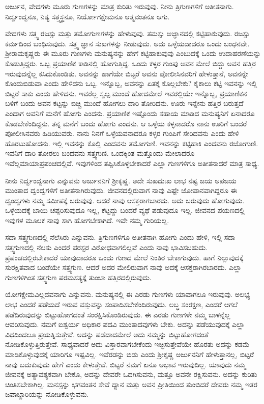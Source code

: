 \begin{artha}
ಅರ್ಜುನ, ವೇದಗಳು ಮೂರು ಗುಣಗಳನ್ನು ಮಾತ್ರ ಕುರಿತು ಇರುವುವು. ನೀನು ತ್ರಿಗುಣಗಳಿಗೆ ಅತೀತನಾಗು. ನಿರ್ದ್ವಂದ್ವನೂ, ನಿತ್ಯ ಸತ್ತ್ವಸ್ಥನೂ, ನಿರ್ಯೋಗಕ್ಷೇಮನೂ ಆತ್ಮವಂತನೂ ಆಗು.
\end{artha}

ವೇದಗಳು ಸತ್ತ್ವ ರಜಸ್ಸು ಮತ್ತು ತಮೋಗುಣಗಳನ್ನು ಹೇಳುವುವು. ತಮಸ್ಸು ಅಜ್ಞಾನದಲ್ಲಿ ಕಟ್ಟಿಹಾಕುವುದು. ರಜಸ್ಸು ಕರ್ಮದಿಂದ ಬಂಧಿಸುವುದು. ಸತ್ತ್ವ ಜ್ಞಾನ ಸುಖಗಳನ್ನು ನೀಡುವುದು. ಅದು ಒಳ್ಳೆಯದಾದರೂ ಒಂದು ಬಂಧನವೇ. ಶ‍್ರೀರಾಮಕೃಷ್ಣರು ಈ ಮೂರು ಗುಣಗಳು ಮನುಷ್ಯನನ್ನು ಹೇಗೆ ಕಟ್ಟಿಹಾಕುವುವು ಎಂಬುದಕ್ಕೆ ಒಂದು ಉದಾಹರಣೆಯನ್ನು ಕೊಡುತ್ತಿದ್ದರು. ಒಬ್ಬ ಪ್ರಯಾಣಿಕ ಕಾಡಿನಲ್ಲಿ ಹೋಗುತ್ತಿದ್ದ. ಒಂದು ಕಳ್ಳರ ಗುಂಪು ಅವನ ಮೇಲೆ ಬಿದ್ದು ಅವನ ಹತ್ತಿರ ಇರುವುದನ್ನೆಲ್ಲ ಕಸಿದುಕೊಂಡಿತು. ಅವನನ್ನು ಹಾಗೆಯೇ ಬಿಟ್ಟರೆ ಅವನು ಪೋಲೀಸಿನವರಿಗೆ ಹೇಳುತ್ತಾನೆ, ಅವನನ್ನೇ ಕೊಂದುಬಿಡುವಾ ಎಂದು ಹೇಳಿದನು ಒಬ್ಬ. ಇನ್ನೊಬ್ಬ, ಅವನನ್ನು ಏತಕ್ಕೆ ಕೊಲ್ಲಬೇಕು? ಕೈಕಾಲು ಕಟ್ಟಿ ಇವನನ್ನು ಇಲ್ಲಿ ಬಿಟ್ಟರೆ ಸಾಕು ಎಂದು ಹೇಳಿದನು. ಇವರೆಲ್ಲ ಸ್ವಲ್ಪ ಮುಂದೆ ಹೋದಮೇಲೆ ಇವರಲ್ಲಿಯೇ ಇನ್ನೊಬ್ಬ, ಪ್ರಯಾಣಿಕನ ಬಳಿಗೆ ಬಂದು ಅವನ ಕಟ್ಟನ್ನು ಬಿಚ್ಚಿ ಮುಂದೆ ಹೋಗಲು ದಾರಿ ತೋರಿದನು. ಊರು ಇನ್ನೇನು ಹತ್ತಿರ ಬರುತ್ತದೆ ಎಂದಾಗ ಅವನಿಗೆ ಮನೆಗೆ ಹೋಗು ಎಂದನು. ಪ್ರಯಾಣಿಕ ಇಷ್ಟೊಂದು ಸಹಾಯ ಮಾಡಿದ ಮನುಷ್ಯನಿಗೆ ಏನಾದರೂ ಕೊಡಬೇಕೆಂದಿದ್ದನು. ತನ್ನ ಮನೆಗೆ ಬಂದು ಹೋಗು ಎಂದನು. ಆ ಒಳ್ಳೆಯ ಕಳ್ಳನಾದರೊ ನಾನು ಊರಿಗೆ ಬಂದರೆ ಪೋಲೀಸಿನವರು ಹಿಡಿಯುವರು. ನಾನು ನಿನಗೆ ಒಳ್ಳೆಯವನಾದರೂ ಕಳ್ಳರ ಗುಂಪಿಗೆ ಸೇರಿದವನು ಎಂದು ಹೇಳಿ ಹೊರಟುಹೋದನು. ಇಲ್ಲಿ ಇವನನ್ನು ಕೊಲ್ಲಿ ಎಂದವನು ತಮೋಗುಣಿ. ಇವನನ್ನು ಕಟ್ಟಿಹಾಕಿ ಎಂದವನು ರಜೋಗುಣಿ. ಇವನಿಗೆ ದಾರಿ ತೋರಲು ಬಂದವನು ಸತ್ತ್ವಗುಣಿ. ಒಂದಕ್ಕಿಂತ ಮತ್ತೊಂದು ಮೇಲಾದರೂ ಇವೆಲ್ಲಮಾಯಾಪ್ರಪಂಚದಲ್ಲಿವೆ. ಇವುಗಳಿಂದ ತಪ್ಪಿಸಿಕೊಳ್ಳಬೇಕಾದರೆ ಎಲ್ಲಾ ಗುಣಗಳಿಗೂ ಅತೀತನಾದರೆ ಮಾತ್ರ ಸಾಧ್ಯ.

ನೀನು ನಿರ್ದ್ವಂದ್ವನಾಗು ಎನ್ನುವನು ಅರ್ಜುನನಿಗೆ ಶ‍್ರೀಕೃಷ್ಣ. ಅದೇ ಸುಖದುಃಖ ಲಾಭ ನಷ್ಟ ಜಯ ಅಪಜಯ ಮುಂತಾದ ದ್ವಂದ್ವಗಳಿಗೆ ಅತೀತನಾಗಿರುವುದು. ಜೀವನದಲ್ಲಿರುವಾಗ ನಾವು ಎಷ್ಟೇ ಜೋಪಾನವಾಗಿದ್ದರೂ ಈ ದ್ವಂದ್ವಗಳು ನಮ್ಮ ಸಮೀಪಕ್ಕೆ ಬರುವುವು. ಆದರೆ ನಾವು ಆಸಕ್ತರಾಗಬಾರದು. ಅದು ಬರುವುದು ಹೋಗುವುದು. ಒಳ್ಳೆಯದಕ್ಕೆ ಬಾಯಿ ಚಪ್ಪರಿಸುವುದೂ ಇಲ್ಲ, ಕೆಟ್ಟದ್ದು ಬಂದರೆ ವ್ಯಥೆ ಪಡುವುದೂ ಇಲ್ಲ. ಜೀವನದ ಪಯಣದಲ್ಲಿ ಇವುಗಳ ಮೂಲಕ ನಾವು ಸಾಗಿ ಹೋಗಬೇಕಾಗಿದೆ. ಇವೇ ನಮ್ಮ ಗುರಿಯಲ್ಲ.

ಸದಾ ಸತ್ತ್ವಗುಣದಲ್ಲಿ ನೆಲೆಸಿರು ಎನ್ನುವನು. ತ್ರಿಗುಣಗಳಿಗೂ ಅತೀತನಾಗಿ ಹೋಗು ಎಂದು ಹೇಳಿ, ಇಲ್ಲಿ ಸದಾ ಸತ್ತ್ವಗುಣದಲ್ಲಿ ನೆಲಸು ಎಂದರೆ ಪರಸ್ಪರ ವಿರೋಧವಾಗಲಿಲ್ಲವೆ ಎಂದು ನಾವು ಭಾವಿಸಬಹುದು. ಪ್ರಪಂಚದಲ್ಲಿರಬೇಕಾದರೆ ಯಾವುದಾದರೂ ಒಂದು ಗುಣದ ಮೇಲೆ ನಿಂತಿರ ಬೇಕಾಗುವುದು. ಹಾಗೆ ನಿಲ್ಲುವುದಕ್ಕೆ ಸುರಕ್ಷಿತವಾದ ಬಂಡೆಯೇ ಸತ್ತ್ವಗುಣ. ಆದರೆ ಅದರ ಮೇಲಿರುವಾಗ ನಾವು ಅದಕ್ಕೆ ಆಸಕ್ತರಾಗಿರಬಾರದು. ಎಲ್ಲಾ ಗುಣಗಳಿಗಿಂತ ಸತ್ತ್ವಗುಣ ಪರಮಸತ್ಯಕ್ಕೆ ತುಂಬಾ ಹತ್ತಿರದಲ್ಲಿರುವುದು.

ಯೋಗಕ್ಷೇಮವಿಲ್ಲದವನಾಗು ಎನ್ನುವನು. ಮನುಷ್ಯನಲ್ಲಿ ಈ ಎರಡು ಗುಣಗಳು ಯಾವಾಗಲೂ ಇರುವುವು. ಅಲಭ್ಯ ಲಾಭ ಎಂದರೆ ಪಡೆಯದೆ ಇರುವ ವಸ್ತುವನ್ನು ಸಂಪಾದಿಸಬೇಕೆಂದಿರುವುದು. ಲಬ್ಧ ಸಂರಕ್ಷಣ, ಎಂದರೆ ಆಗಲೆ ಪಡೆದಿರುವುದನ್ನು ಬಿಟ್ಟುಹೋಗದಂತೆ ಸಂರಕ್ಷಿಸಿಕೊಂಡಿರುವುದು. ಈ ಎರಡು ಗುಣಗಳೇ ನಮ್ಮ ಬಾಳನ್ನೆಲ್ಲ ಆವರಿಸುವುದು. ನಮಗೆ ಐಶ್ವರ್ಯ ಅಧಿಕಾರ ಪದವಿ ಮುಂತಾದವುಗಳು ಬೇಕು. ಅದನ್ನು ಪಡೆಯುವುದಕ್ಕೆ ಎಲ್ಲಾ ವಿಧದಿಂದಲೂ ಪ್ರಯತ್ನಿಸುತ್ತೇವೆ. ಅದನ್ನು ಪಡೆದಾದಮೇಲೆ ಅದು ನಮ್ಮನ್ನು ಬಿಟ್ಟುಹೋಗದಂತೆ ನೋಡಿಕೊಳ್ಳುತ್ತಿರುತ್ತೇವೆ. ಸಾಧ್ಯವಾದರೆ ಅದು ವಿಸ್ತಾರವಾಗಬೇಕೆಂದು ಇಚ್ಛಿಸುತ್ತೇವೆಯೇ ಹೊರತು ಅದನ್ನು ಕಡಮೆ ಮಾಡಿಕೊಳ್ಳುವುದಕ್ಕೆ ಯಾರಿಗೂ ಇಷ್ಟವಿಲ್ಲ. ಇವೆರಡನ್ನು ಬಿಡು ಎಂದು ಶ‍್ರೀಕೃಷ್ಣ ಅರ್ಜುನನಿಗೆ ಹೇಳುತ್ತಾನಲ್ಲ, ಬಿಟ್ಟರೆ ನಾವು ಬದುಕುವುದು ಹೇಗೆ ಎಂದು ಕೇಳುತ್ತೇವೆ. ಬಿಟ್ಟರೆ ನಮಗೆ ಏನೂ ಅಭಾವ ಇರುವುದಿಲ್ಲ. ಯಾವುದು ನಮ್ಮ ಜೀವನಕ್ಕೆ ಅತ್ಯಾವಶ್ಯಕವಾಗಿ ಬೇಕೊ, ಅದನ್ನು ದೇವರೇ ಒದಗಿಸುವನು, ಮತ್ತೂ ಅವನೇ ರಕ್ಷಿಸುವನು. ಅದನ್ನು ಕುರಿತು ಚಿಂತಿಸಬೇಕಾಗಿಲ್ಲ. ಮನಸ್ಸನ್ನು ಭಗವಂತನ ಸೇವೆ ಧ್ಯಾನ ಮತ್ತು ಅವನ ಪ್ರೀತಿಯಿಂದ ತುಂಬಿದರೆ ದೇವರು ನಮ್ಮ ಇತರ ಜವಾಬ್ದಾರಿಯನ್ನು ನೋಡಿಕೊಳ್ಳುವನು.

